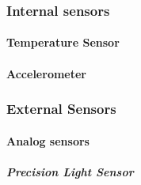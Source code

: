 \subsubsection{Internal sensors}

\paragraph{Temperature Sensor}


\paragraph{Accelerometer}

\subsubsection{External Sensors}

\paragraph{Analog sensors}



\subparagraph{Precision Light Sensor}

